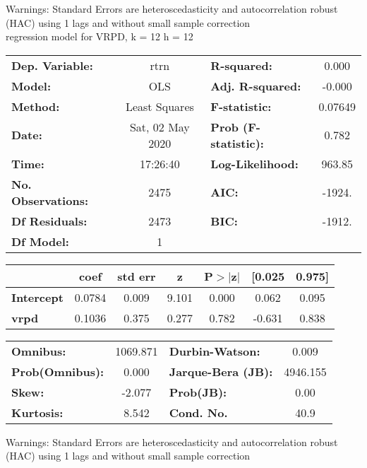 Warnings: \newline
 [1] Standard Errors are heteroscedasticity and autocorrelation robust (HAC) using 1 lags and without small sample correction\\ 

regression model for VRPD, k = 12 h = 12\begin{center}
\begin{tabular}{lclc}
\toprule
\textbf{Dep. Variable:}    &       rtrn       & \textbf{  R-squared:         } &     0.000   \\
\textbf{Model:}            &       OLS        & \textbf{  Adj. R-squared:    } &    -0.000   \\
\textbf{Method:}           &  Least Squares   & \textbf{  F-statistic:       } &   0.07649   \\
\textbf{Date:}             & Sat, 02 May 2020 & \textbf{  Prob (F-statistic):} &    0.782    \\
\textbf{Time:}             &     17:26:40     & \textbf{  Log-Likelihood:    } &    963.85   \\
\textbf{No. Observations:} &        2475      & \textbf{  AIC:               } &    -1924.   \\
\textbf{Df Residuals:}     &        2473      & \textbf{  BIC:               } &    -1912.   \\
\textbf{Df Model:}         &           1      & \textbf{                     } &             \\
\bottomrule
\end{tabular}
\begin{tabular}{lcccccc}
                   & \textbf{coef} & \textbf{std err} & \textbf{z} & \textbf{P$> |$z$|$} & \textbf{[0.025} & \textbf{0.975]}  \\
\midrule
\textbf{Intercept} &       0.0784  &        0.009     &     9.101  &         0.000        &        0.062    &        0.095     \\
\textbf{vrpd}      &       0.1036  &        0.375     &     0.277  &         0.782        &       -0.631    &        0.838     \\
\bottomrule
\end{tabular}
\begin{tabular}{lclc}
\textbf{Omnibus:}       & 1069.871 & \textbf{  Durbin-Watson:     } &    0.009  \\
\textbf{Prob(Omnibus):} &   0.000  & \textbf{  Jarque-Bera (JB):  } & 4946.155  \\
\textbf{Skew:}          &  -2.077  & \textbf{  Prob(JB):          } &     0.00  \\
\textbf{Kurtosis:}      &   8.542  & \textbf{  Cond. No.          } &     40.9  \\
\bottomrule
\end{tabular}
\end{center}

Warnings: \newline
 [1] Standard Errors are heteroscedasticity and autocorrelation robust (HAC) using 1 lags and without small sample correction\\ 

